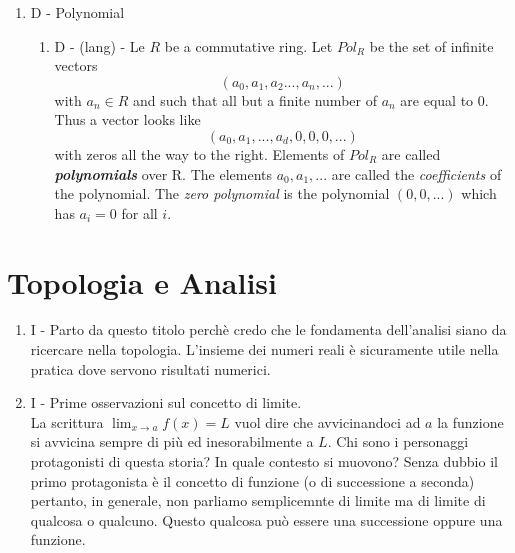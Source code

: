 \documentclass[]{article}
\begin{document}
\begin{enumerate}
	\item D - Polynomial
			  \begin{enumerate}
			  	\item D - (lang) - Le $R$ be a commutative ring. Let $Pol_R$ be the set of infinite vectors 
			  	                   \[
			  	                   		(a_0, a_1, a_2 ..., a_n, ...) 
			  	                   \]
			  	                   with $a_n \in R$ and such that all but a finite number of $a_n$ are equal to $0$. \\
			  	                   Thus a vector looks like 
			  	                   \[
			  	                   		(a_0, a_1, ..., a_d, 0,0,0,...)
			  	                   \]
			  	                   with zeros all the way to the right. Elements of $Pol_R$ are called \emph{\bfseries{polynomials}} over R. The elements $a_0, a_1, ...$ are called the \emph{coefficients} of the polynomial. The \emph{zero polynomial} is the polynomial $(0,0,...)$ which has $a_i=0$ for all $i$. 
			  	                   
			  \end{enumerate}
\end{enumerate}

\section{Topologia e Analisi}
	\begin{enumerate}
		\item I - Parto da questo titolo perch\`e credo che le fondamenta dell'analisi siano da ricercare nella topologia. L'insieme dei numeri reali \`e sicuramente utile nella pratica dove servono risultati numerici.
		\item I - Prime osservazioni sul concetto di limite. \\
			  La scrittura $\lim_{x \to a}{f(x)}=L$ vuol dire che avvicinandoci ad $a$ la funzione si avvicina sempre di pi\`u ed inesorabilmente a $L$. Chi sono i personaggi protagonisti di questa storia? In quale contesto si muovono? Senza dubbio il primo protagonista \`e il concetto di funzione (o di successione a seconda) pertanto, in generale, non parliamo semplicemnte di limite ma di limite di qualcosa o qualcuno. Questo qualcosa pu\`o essere una successione oppure una funzione.
	\end{enumerate}

\end{document}
